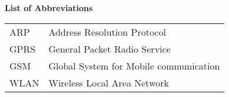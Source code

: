 %
%
% 
% 
% 

\noindent
 {\Large\bfseries List of Abbreviations}
\vspace{0.65cm}

\begin{table*}[htbp]
		\begin{tabular}{ll}
			ARP & Address Resolution Protocol \\
			GPRS & General Packet Radio Service \\
			GSM  &  Global System for Mobile communication \\
			WLAN & Wireless Local Area Network \\
		\end{tabular}
\end{table*}